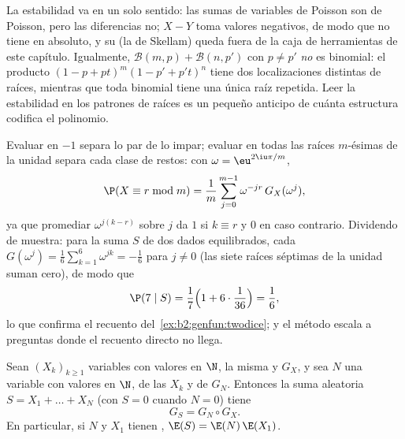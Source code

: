 \begin{remark}
La estabilidad va en un solo sentido: las sumas de variables de
Poisson  son de Poisson, pero las diferencias no; $X -
Y$ toma valores negativos, de modo que no tiene  en
absoluto, y su  (la  de Skellam) queda fuera de la
caja de herramientas de este capítulo. Igualmente, $\mathcal B(m, p)
+ \mathcal B(n, p')$ con $p \neq p'$ \emph{no} es binomial: el
producto $(1 - p + pt)^m(1 - p' + p't)^n$ tiene dos localizaciones
distintas de raíces, mientras que toda  binomial
tiene una única raíz repetida. Leer la estabilidad en los patrones de
raíces es un pequeño anticipo de cuánta estructura codifica el
polinomio.
\end{remark}

\begin{remark}
Evaluar en $-1$ separa lo par de lo impar; evaluar en todas las
raíces $m$-ésimas de la unidad separa cada clase de restos: con
$\omega = \eu^{2\iu\pi/m}$,
\[
\P(X \equiv r \bmod m)
= \frac1m\sum_{j=0}^{m-1}\omega^{-jr}\,G_X(\omega^j),
\]
ya que promediar $\omega^{j(k-r)}$ sobre $j$ da $1$ si $k \equiv r$ y
$0$ en caso contrario. Dividendo de muestra: para la suma $S$ de dos
dados equilibrados, cada $G(\omega^j) = \frac16\sum_{k=1}^6
\omega^{jk} = -\frac16$ para $j \neq 0$ (las siete raíces séptimas de
la unidad suman cero), de modo que
\[
\P(7 \mid S) = \frac17\Bigl(1 +
6\cdot\frac1{36}\Bigr) = \frac16 ,
\]
lo que confirma el recuento del~\cref{ex:b2:genfun:twodice}; y el
método escala a preguntas donde el recuento directo no llega.
\end{remark}

\begin{theorem}\label{thm:b2:genfun:compound}
Sean $(X_k)_{k\geq1}$ variables  con valores en $\N$, la
misma  y  $G_X$, y sea $N$ una variable con
valores en $\N$,  de las $X_k$ y de
 $G_N$. Entonces la suma aleatoria $S = X_1 + \dots +
X_N$ (con $S = 0$ cuando $N = 0$) tiene 
\[
G_S = G_N \circ G_X .
\]
En particular, si $N$ y $X_1$ tienen , $\E(S) =
\E(N)\,\E(X_1)$.
\end{theorem}

